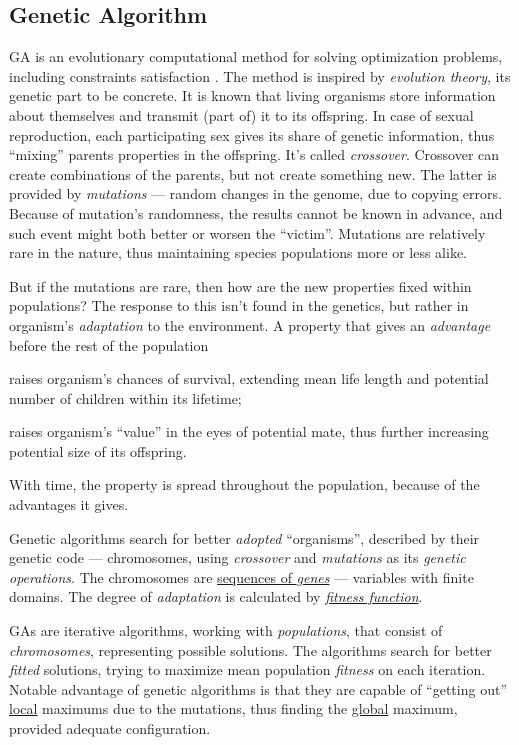 \documentclass[../header]{subfiles}
\begin{document}
\providecommand{\rootdir}{..}



\subsection{Genetic Algorithm}
GA is an evolutionary computational method for solving optimization problems,
including constraints satisfaction \cite{GA-about}.
The method is inspired by \emph{evolution theory}, its genetic part to be concrete.
It is known that living organisms
store information about themselves and transmit (part of) it to its offspring.
In case of sexual reproduction, each participating sex gives its share of
genetic information, thus ``mixing'' parents properties in the offspring.
It's called \emph{crossover}.
Crossover can create combinations of the parents, but not create something new.
The latter is provided by \emph{mutations} --- random changes in the genome, due
to copying errors. Because of mutation's randomness, the results cannot be known
in advance, and such event might both better or worsen the ``victim''. Mutations
are relatively rare in the nature, thus maintaining species populations more or
less alike.

But if the mutations are rare, then how are the new properties fixed within
populations? The response to this isn't found in the genetics, but rather in
organism's \emph{adaptation} to the environment. A property that gives an
\emph{advantage} before the rest of the population
\begin{enumerate*}[1)]
  \item raises organism's chances of survival, extending mean life length and
        potential number of children within its lifetime;
  \item raises organism's ``value'' in the eyes of potential mate, thus further
        increasing potential size of its offspring.
\end{enumerate*}
With time, the property is spread throughout the population, because of the
advantages it gives.

\bigskip\noindent
Genetic algorithms search for better \emph{adopted} ``organisms'', described
by their genetic code --- chromosomes, using \emph{crossover} and \emph{mutations}
as its \emph{genetic operations}.
The chromosomes are \underline{sequences of \emph{genes}} --- variables with finite
domains. The degree of \emph{adaptation} is calculated by
\underline{\emph{fitness function}}.

GAs are iterative algorithms, working with \emph{populations}, that consist of
\emph{chromosomes}, representing possible solutions. The algorithms search
for better \emph{fitted} solutions, trying to maximize mean population
\emph{fitness} on each iteration.
Notable advantage of genetic algorithms is that they are capable of
``getting out'' \underline{local} maximums due to the mutations, thus finding
the \underline{global} maximum, provided adequate configuration.
\end{document}
